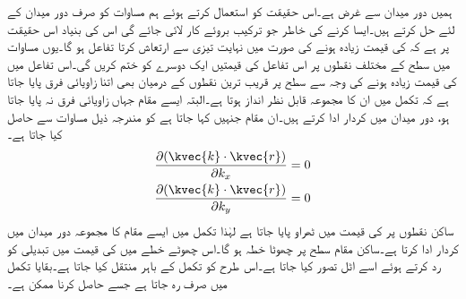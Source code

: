 ہمیں دور میدان سے غرض ہے۔اس حقیقت کو استعمال کرتے ہوئے ہم  مساوات  کو صرف دور میدان کے لئے حل کرتے ہیں۔ایسا کرنے کی خاطر جو ترکیب بروئے کار لائی جائے گی اس کی بنیاد اس حقیقت پر ہے کہ  کی قیمت زیادہ ہونے کی صورت میں   نہایت تیزی سے ارتعاش کرتا تفاعل ہو گا۔یوں مساوات  میں  سطح کے مختلف نقطوں پر اس تفاعل کی قیمتیں ایک دوسرے کو ختم کریں گی۔اس تفاعل میں  کی قیمت زیادہ ہونے کی وجہ سے   سطح پر قریب ترین  نقطوں کے درمیان بھی اتنا زاویائی فرق  پایا جاتا ہے کہ تکمل میں ان کا مجموعہ قابل نظر انداز ہوتا ہے۔البتہ ایسے مقام جہاں زاویائی فرق نہ پایا جاتا ہو،  دور میدان میں کردار ادا کرتے ہیں۔ان مقام جنہیں  کہا جاتا ہے کو مندرجہ ذیل مساوات سے حاصل کیا جاتا ہے۔
\begin{gather}
  \begin{aligned}\label{مساوات_اینٹینا_ساکن_نقطے}
\frac{\partial (\kvec{k}\cdot \kvec{r})}{\partial k_x}&=0\\
\frac{\partial (\kvec{k}\cdot \kvec{r})}{\partial k_y}&=0
\end{aligned}
\end{gather}
ساکن نقطوں پر  کی قیمت میں ٹھراو پایا جاتا ہے لہٰذا تکمل میں ایسے مقام کا مجموعہ دور میدان میں کردار ادا کرتا ہے۔ساکن مقام  سطح پر چھوٹا خطہ ہو گا۔اس چھوٹے خطے  میں  کی قیمت میں تبدیلی کو رد کرتے ہوئے اسے اٹل تصور کیا جاتا ہے۔اس طرح   کو تکمل کے باہر منتقل کیا جاتا ہے۔بقایا تکمل میں صرف  رہ جاتا ہے جسے حاصل کرنا ممکن ہے۔


